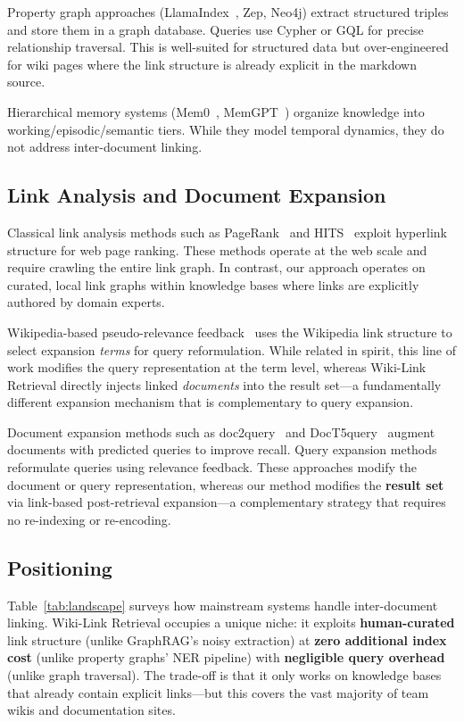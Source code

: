 \documentclass[sigconf,review]{acmart}
\newcommand{\sys}{Wiki-Link Retrieval\xspace}
\begin{document}
Property graph approaches (LlamaIndex~\citep{llamaindex_propgraph}, Zep, Neo4j) extract
structured triples and store them in a graph database. Queries use Cypher
or GQL for precise relationship traversal. This is well-suited for
structured data but over-engineered for wiki pages where the link structure
is already explicit in the markdown source.

Hierarchical memory systems (Mem0~\citep{mem0}, MemGPT~\citep{memgpt}) organize
knowledge into working/episodic/semantic tiers. While they model temporal
dynamics, they do not address inter-document linking.

\subsection{Link Analysis and Document Expansion}

Classical link analysis methods such as PageRank~\citep{page1999pagerank} and
HITS~\citep{kleinberg1999hits} exploit hyperlink structure for web page ranking.
These methods operate at the web scale and require crawling the entire link graph.
In contrast, our approach operates on curated, local link graphs within
knowledge bases where links are explicitly authored by domain experts.

Wikipedia-based pseudo-relevance feedback~\citep{prf_wikipedia2009} uses the
Wikipedia link structure to select expansion \emph{terms} for query reformulation.
While related in spirit, this line of work modifies the query representation
at the term level, whereas \sys directly injects linked \emph{documents} into
the result set---a fundamentally different expansion mechanism that is
complementary to query expansion.

Document expansion methods such as doc2query~\citep{nogueira2019doc2query} and
DocT5query~\citep{doct5query2021} augment documents with predicted queries to improve
recall. Query expansion methods~\citep{rocchio1971relevance,zamani2017qe} reformulate
queries using relevance feedback. These approaches modify the document or query
representation, whereas our method modifies the \textbf{result set} via
link-based post-retrieval expansion---a complementary strategy that requires
no re-indexing or re-encoding.

\subsection{Positioning}

Table~\ref{tab:landscape} surveys how mainstream systems handle
inter-document linking. \sys occupies a unique niche: it exploits \textbf{human-curated}
link structure (unlike GraphRAG's noisy extraction) at \textbf{zero additional index
cost} (unlike property graphs' NER pipeline) with \textbf{negligible query
overhead} (unlike graph traversal). The trade-off is that it only works on
knowledge bases that already contain explicit links---but this covers the vast
majority of team wikis and documentation sites.
\end{document}

